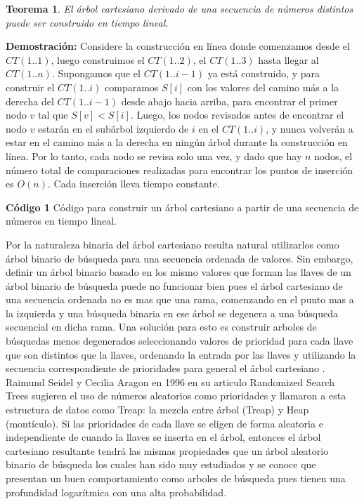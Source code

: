 \documentclass[12pt]{article}
\newcommand{\proof}{\textbf{Demostración:} }
\newcommand{\nl}{\vspace{0.3cm}}
\newcommand{\ct}{árbol cartesiano }
\newtheorem{theorem}{Teorema}
\begin{document}
\begin{theorem}
	El \ct derivado de una secuencia de números distintos puede ser construido en tiempo lineal.
\end{theorem}

\proof Considere la construcción en línea donde comenzamos desde el $CT(1..1)$, luego construimos el $CT(1..2)$, el $CT(1..3)$ hasta llegar al $CT(1..n)$. Supongamos que el $CT(1..i-1)$ ya está construido, y para construir el $CT(1..i)$ comparamos $S[i]$ con los valores del camino más a la derecha del $CT(1..i-1)$ desde abajo hacia arriba, para encontrar el primer nodo $v$ tal que $S[v] < S[i]$. Luego, los nodos revisados antes de encontrar el nodo $v$ estarán en el subárbol izquierdo de $i$ en el $CT(1..i)$, y nunca volverán a estar en el camino más a la derecha en ningún árbol durante la construcción en línea. Por lo tanto, cada nodo se revisa solo una vez, y dado que hay $n$ nodos, el número total de comparaciones realizadas para encontrar los puntos de inserción es $O(n)$. Cada inserción lleva tiempo constante.

\nl

\textbf{Código 1} Código para construir un \ct a partir de una secuencia de números en tiempo lineal.



Por la naturaleza binaria del \ct resulta natural utilizarlos como árbol binario de búsqueda para una secuencia ordenada de valores. Sin embargo, definir un árbol binario basado en los mismo valores que forman las llaves de un árbol binario de búsqueda puede no funcionar bien pues el \ct de una secuencia ordenada no es mas que una rama, comenzando en el punto mas a la izquierda y una búsqueda binaria en ese árbol se degenera a una búsqueda secuencial en dicha rama. Una solución para esto es construir arboles de búsquedas menos degenerados seleccionando valores de prioridad para cada llave que son distintos que la llaves, ordenando la entrada por las llaves y utilizando la secuencia correspondiente de prioridades para general el \ct.\\

Raimund Seidel y Cecilia Aragon en 1996 en su articulo Randomized Search Trees sugieren el uso de números aleatorios como prioridades y llamaron a esta estructura de datos como Treap: la mezcla entre árbol (Treap) y Heap (montículo). Si las prioridades de cada llave se eligen de forma aleatoria e independiente de cuando la llaves se inserta en el árbol, entonces el \ct resultante tendrá las mismas propiedades que un árbol aleatorio binario de búsqueda los cuales han sido muy estudiados y se conoce que presentan un buen comportamiento como arboles de búsqueda pues tienen una profundidad logarítmica con una alta probabilidad.
\end{document}
